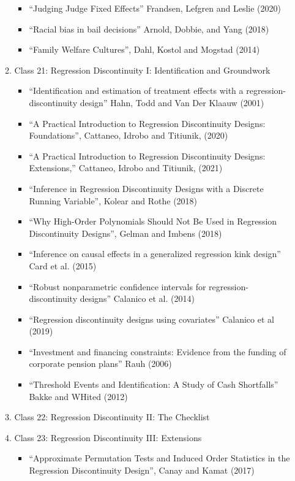 \documentclass[11pt, a4paper]{article}
\begin{document}
\begin{enumerate}
\begin{enumerate}
\begin{itemize}
    \item ``Judging Judge Fixed Effects'' Frandsen, Lefgren and Leslie (2020)
    \item ``Racial bias in bail decisions'' Arnold, Dobbie, and Yang (2018)
    \item ``Family Welfare Cultures'', Dahl, Kostol and Mogstad (2014)
    \end{itemize}
  \item Class 21: Regression Discontinuity I: Identification and Groundwork
    \begin{itemize}
    \item ``Identification and estimation of treatment effects with a regression-discontinuity design'' Hahn, Todd and Van Der Klaauw (2001)
    \item ``A Practical Introduction to Regression Discontinuity Designs: Foundations'', Cattaneo, Idrobo and Titiunik, (2020)
    \item ``A Practical Introduction to Regression Discontinuity Designs: Extensions,''  Cattaneo, Idrobo and Titiunik, (2021)
    \item ``Inference in Regression Discontinuity Designs with a Discrete Running Variable'', Kolear and Rothe (2018)
    \item ``Why High-Order Polynomials Should Not Be Used in Regression Discontinuity Designs'', Gelman and Imbens (2018)
    \item ``Inference on causal effects in a generalized regression kink design'' Card et al. (2015)
    \item ``Robust nonparametric confidence intervals for regression-discontinuity designs'' Calanico et al. (2014)
    \item ``Regression discontinuity designs using covariates'' Calanico et al (2019)
    \item  ``Investment and financing constraints: Evidence from the funding of corporate pension plans'' Rauh (2006)
    \item ``Threshold Events and Identification: A Study of Cash Shortfalls'' Bakke and WHited (2012)
    \end{itemize}
  \item Class 22: Regression Discontinuity II: The Checklist
  \item Class 23: Regression Discontinuity III: Extensions
    \begin{itemize}
    \item ``Approximate Permutation Tests and Induced Order Statistics in the Regression Discontinuity Design'', Canay and Kamat (2017)

\end{itemize}
\end{enumerate}
\end{enumerate}
\end{document}
